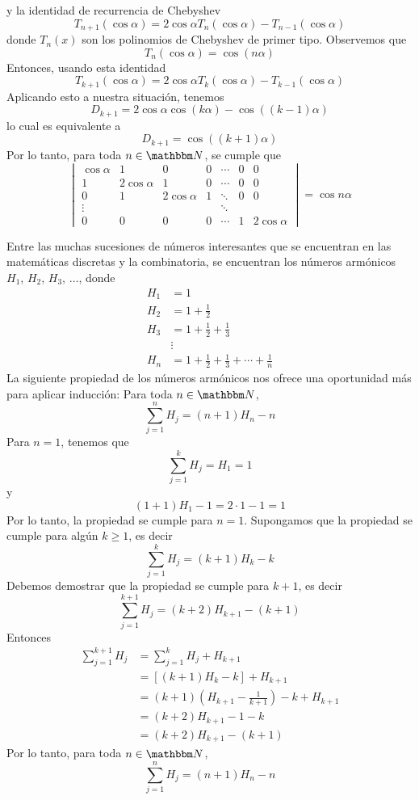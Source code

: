 \begin{example}
    y la identidad de recurrencia de Chebyshev
    $$T_{n+1}(\cos \alpha) = 2 \cos \alpha T_n(\cos \alpha) - T_{n-1}(\cos \alpha)$$
    donde $T_n(x)$ son los polinomios de Chebyshev de primer tipo. Observemos que
    $$T_n(\cos \alpha) = \cos(n \alpha)$$
    Entonces, usando esta identidad
    $$T_{k+1}(\cos \alpha) = 2 \cos \alpha T_k(\cos \alpha) - T_{k-1}(\cos \alpha)$$
    Aplicando esto a nuestra situación, tenemos
    $$D_{k+1} = 2 \cos \alpha \cos(k \alpha) - \cos((k-1) \alpha)$$
    lo cual es equivalente a
    $$D_{k+1} = \cos((k+1) \alpha)$$\newpage\noindent
    Por lo tanto, para toda $n \in \NN$, se cumple que
    $$\begin{vmatrix}
        \cos \alpha & 1 & 0 & 0 & \cdots & 0 & 0 \\
        1 & 2 \cos \alpha & 1 & 0 & \cdots & 0 & 0 \\
        0 & 1 & 2 \cos \alpha & 1 & \ddots & 0 & 0 \\
        \vdots & & & & \ddots & & \\
        0 & 0 & 0 & 0 & \cdots & 1 & 2 \cos \alpha
    \end{vmatrix} = \cos n \alpha$$
\end{example}

\begin{example}
    Entre las muchas sucesiones de números interesantes que se encuentran en las matemáticas discretas y la combinatoria, se encuentran los números armónicos $H_1$, $H_2$, $H_3$, $\dots$, donde
    \begin{align*}
        H_1 & = 1 \\
        H_2 & = 1 + \frac{1}{2} \\
        H_3 & = 1 + \frac{1}{2} + \frac{1}{3} \\
        & \vdots \\
        H_n & = 1 + \frac{1}{2} + \frac{1}{3} + \cdots + \frac{1}{n}
    \end{align*}
    La siguiente propiedad de los números armónicos nos ofrece una oportunidad más para aplicar inducción: Para toda $n \in \NN$,
    $$\sum_{j=1}^{n} H_j = (n + 1)H_n - n$$
    \demostracion Para $n = 1$, tenemos que
    $$\sum_{j=1}^{k} H_j = H_1 = 1$$
    y
    $$(1 + 1)H_1 - 1 = 2 \cdot 1 - 1 = 1$$
    Por lo tanto, la propiedad se cumple para $n = 1$. Supongamos que la propiedad se cumple para algún $k \geq 1$, es decir
    $$\sum_{j=1}^{k} H_j = (k + 1)H_k - k$$
    Debemos demostrar que la propiedad se cumple para $k + 1$, es decir
    $$\sum_{j=1}^{k+1} H_j = (k + 2)H_{k+1} - (k + 1)$$
    Entonces
    \begin{align*}
        \sum_{j=1}^{k+1} H_j & = \sum_{j=1}^{k} H_j + H_{k+1} \\
        & = [(k + 1)H_k - k] + H_{k+1} \\
        & = (k + 1) \left( H_{k+1} - \frac{1}{k+1} \right) - k + H_{k+1} \\
        & = (k + 2) H_{k+1} - 1 - k \\
        & = (k + 2) H_{k+1} - (k + 1)
    \end{align*}
    Por lo tanto, para toda $n \in \NN$,
    $$\sum_{j=1}^{n} H_j = (n + 1)H_n - n$$
\end{example}

